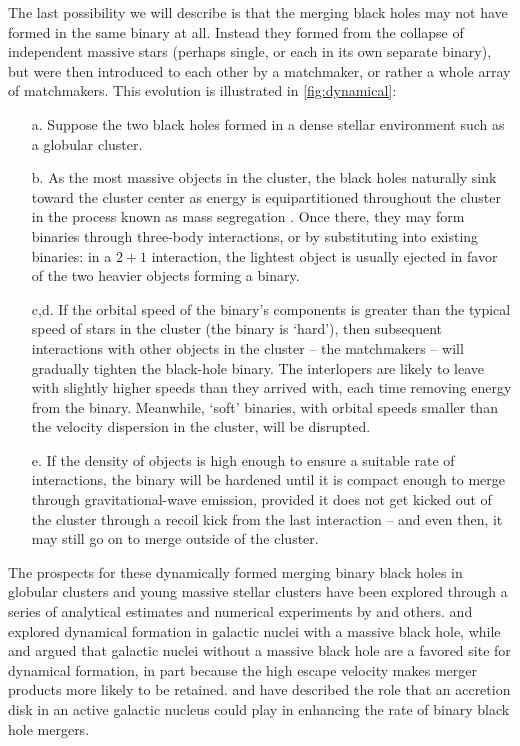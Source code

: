 \documentclass[iop,onecolumn]{revtex4}
\begin{document}
The last possibility we will describe is that the merging black holes may not have formed in the same binary at all.  Instead they formed from the collapse of independent massive stars (perhaps single, or each in its own separate binary), but were then introduced to each other by a matchmaker, or rather a whole array of matchmakers.   This evolution is illustrated in \autoref{fig:dynamical}: 
\begin{enumerate}
\item[a.] Suppose the two black holes formed in a dense stellar environment such as a globular cluster.  
\item[b.] As the most massive objects in the cluster, the black holes naturally sink toward the cluster center as energy is equipartitioned throughout the cluster in the process known as mass segregation \citep[but see][]{Trenti:2013}.  Once there, they may form binaries through three-body interactions, or by substituting into existing binaries: in a $2+1$ interaction, the lightest object is usually ejected in favor of the two heavier objects forming a binary.  
\item[c,d.] If the orbital speed of the binary's components is greater than the typical speed of stars in the cluster (the binary is `hard'), then subsequent interactions with other objects in the cluster -- the matchmakers -- will gradually tighten the black-hole binary. The interlopers are likely to leave with slightly higher speeds than they arrived with, each time removing energy from the binary.   Meanwhile, `soft' binaries, with orbital speeds smaller than the velocity dispersion in the cluster, will be disrupted.
\item[e.] If the density of objects is high enough to ensure a suitable rate of interactions, the binary will be hardened until it is compact enough to merge through gravitational-wave emission, provided it does not get kicked out of the cluster through a recoil kick from the last interaction -- and even then, it may still go on to merge outside of the cluster.  
\end{enumerate}

The prospects for these dynamically formed merging binary black holes in globular clusters and young massive stellar clusters have been explored through a series of analytical estimates and numerical experiments by \citet{Sigurdsson:1993,Kulkarni:1993,PZwart:2000,OLeary:2006,Banerjee:2010,Downing:2011,Morscher:2015,Mapelli:2016,Rodriguez:2016} and others.  \citet{OLeary:2008} \citep[but see][]{Tsang:2013} and \citet{AntoniniPerets:2012} explored dynamical formation in galactic nuclei with a massive black hole, while \citet{MillerLauburg:2008} and \citet{AntoniniRasio:2016} argued that galactic nuclei without a massive black hole are a favored site for dynamical formation, in part because the high escape velocity makes merger products more likely to be retained.  \citet{Bartos:2016} and \citet{Stone:2016} have described the role that an accretion disk in an active galactic nucleus could play in enhancing the rate of binary black hole mergers.
\end{document}

